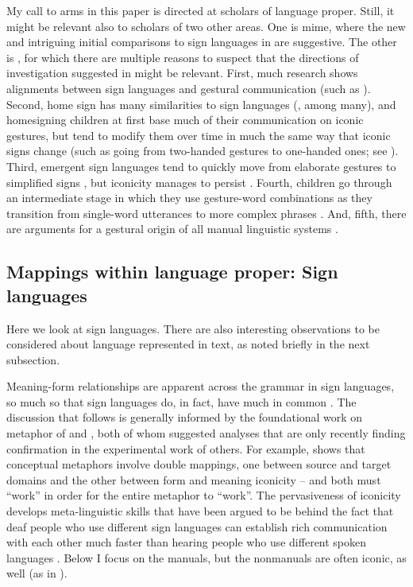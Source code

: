 \documentclass[output=paper,
modfonts
]{LSP/langsci}
\begin{document}
My call to arms in this paper is directed at scholars of language
proper. Still, it might be relevant also to scholars of two other areas.
One is mime, where the new and intriguing initial comparisons to sign
languages in \citet{suttonspencebraem2013} are suggestive. The
other is , for which there are multiple reasons to suspect that
the directions of investigation suggested in  might be
relevant. First, much research shows alignments between sign languages
and gestural communication (such as \citealt{hall2013}).
Second, home sign has many similarities to sign languages (\citealt{goldin2005}, among many), and homesigning children at first base much of their
communication on iconic gestures, but tend to modify them over time in
much the same way that iconic signs change (such as going from
two-handed gestures to one-handed ones; see \citealt{tomaszewski2006}). Third,
emergent sign languages tend to quickly move from elaborate gestures to
simplified signs \citep{kocab2014}, but iconicity manages
to persist \citep{hwang2016}. Fourth, children go through an
intermediate stage in which they use gesture-word combinations as they
transition from single-word utterances to more complex phrases \citep{capirci1996}. And, fifth, there are arguments for a gestural origin of
all manual linguistic systems \citep{ortega2015}.

\subsection{Mappings within language proper: Sign languages}

Here we look at sign languages. There are also interesting observations
to be considered about language represented in text, as noted briefly in
the next subsection.

Meaning-form relationships are apparent across the grammar in sign
languages, so much so that sign languages do, in fact, have much in common \citep{woll2003}. The discussion that follows is generally informed by
the foundational work on metaphor of \citet{wilcox2000} and \citet{taub2001}, both
of whom suggested analyses that are only recently finding confirmation
in the experimental work of others. For example, \citet{meir2010} shows that
conceptual metaphors involve double mappings, one between source and
target domains and the other between form and meaning iconicity -- and
both must ``work'' in order for the entire metaphor to ``work''. The
pervasiveness of iconicity develops meta-linguistic skills that have
been argued to be behind the fact that deaf people who use different
sign languages can establish rich communication with each other much
faster than hearing people who use different spoken languages \citep{zeshan2015}. Below I focus on the manuals, but the nonmanuals are often
iconic, as well (as in \citealt{pizzuto2008}).
\end{document}
